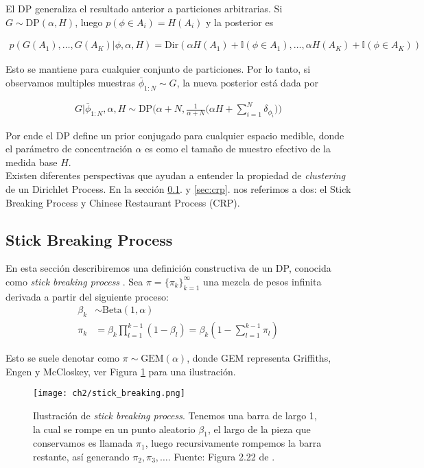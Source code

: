 \documentclass[letterpaper,12pt,oneside]{book} %
\begin{document}
El DP generaliza el resultado anterior a particiones arbitrarias. Si $G\sim \text{DP}(\alpha, H)$, luego $p(\phi \in A_{i})=H(A_{i})$ y la posterior es

\begin{align}
    p(G(A_{1}), \ldots, G(A_{K})|\phi, \alpha, H) = \text{Dir}(\alpha H(A_{1})+\mathbb{I}(\phi \in A_{1}), \ldots, \alpha H(A_{K})+\mathbb{I}(\phi \in A_{K}))
\end{align}

Esto se mantiene para cualquier conjunto de particiones. Por lo tanto, si observamos multiples muestras $\bar{\phi}_{1:N}\sim G$, la nueva posterior está dada por 

\begin{align}
G|\bar{\phi}_{1:N}, \alpha, H \sim \text{DP}\bigg(\alpha+N, \frac{1}{\alpha+N}\bigg(\alpha H+\sum_{i=1}^{N}\delta_{\phi_{i}}\bigg)\bigg)
\end{align}

Por ende el DP define un prior conjugado para cualquier espacio medible, donde el parámetro de concentración $\alpha$ es como el tamaño de muestro efectivo de la medida base $H$.\\

Existen diferentes perspectivas que ayudan a entender la propiedad de \textit{clustering} de un Dirichlet Process. En la sección \ref{sec:sbp}. y \ref{sec:crp}. nos referimos a dos: el Stick Breaking Process y Chinese Restaurant Process (CRP).

\subsection{Stick Breaking Process}
\label{sec:sbp}

En esta sección describiremos una definición constructiva de un DP, conocida como \textit{stick breaking process} \citep{sethuraman1994constructive}. Sea $\pi=\{\pi_{k}\}_{k=1}^{\infty}$ una mezcla de pesos infinita derivada a partir del siguiente proceso:
\begin{align}
    \beta_{k} & \sim \text{Beta}(1, \alpha)\\
    \pi_{k} & = \beta_{k}\prod_{l=1}^{k-1}(1-\beta_{l}) = \beta_{k}(1-\sum_{l=1}^{k-1}\pi_{l})
\end{align}

Esto se suele denotar como $\pi \sim \text{GEM}(\alpha)$, donde GEM representa Griffiths, Engen y McCloskey, ver Figura  \ref{img:stick_breaking} para una ilustración. 

\begin{figure}
    \centering
    \texttt{[image: ch2/stick\_breaking.png]}
    \caption{Ilustración de \textit{stick breaking process}. Tenemos una barra de largo 1, la cual se rompe en un punto aleatorio $\beta_{1}$, el largo de la pieza que conservamos es llamada $\pi_{1}$, luego recursivamente rompemos la barra restante, así generando $\pi_{2}, \pi_{3}, \ldots$. Fuente: Figura 2.22 de \citep{sudderth2006graphical}.}
    \label{img:stick_breaking}
\end{figure}
\end{document}

